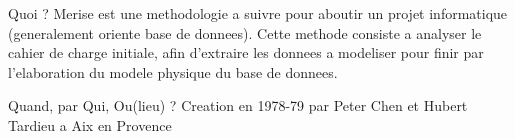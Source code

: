 \documentclass{beamer}
\begin{document}
    \begin{frame}
        Quoi ?
        \newline
        \newline
            Merise est une methodologie a suivre pour aboutir un projet informatique (generalement oriente base de donnees).
        \newline
        \newline
            Cette methode consiste a analyser le cahier de charge initiale,
            afin d'extraire les donnees a modeliser pour finir par l'elaboration du modele physique du base de donnees.
    \end{frame}

    \begin{frame}
        Quand, par Qui, Ou(lieu)  ?
        \newline
        \newline
            Creation en 1978-79 par Peter Chen et Hubert Tardieu a Aix en Provence
    \end{frame}

    \begin{frame}

    \end{frame}
\end{document}
